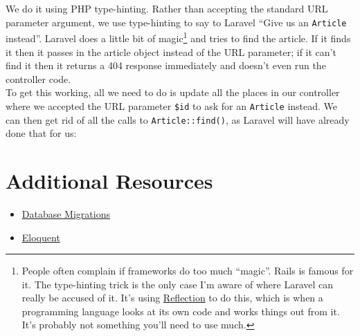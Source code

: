 We do it using PHP type-hinting. Rather than accepting the standard URL parameter argument, we use type-hinting to say to Laravel ``Give us an \texttt{Article} instead''. Laravel does a little bit of magic\footnote{People often complain if frameworks do too much ``magic''. Rails is famous for it. The type-hinting trick is the only case I'm aware of where Laravel can really be accused of it. It's using \href{https://www.culttt.com/2014/07/02/reflection-php}{Reflection} to do this, which is when a programming language looks at its own code and works things out from it. It's probably not something you'll need to use much.} and tries to find the article. If it finds it then it passes in the article object instead of the URL parameter; if it can't find it then it returns a 404 response immediately and doesn't even run the controller code.
\\

To get this working, all we need to do is update all the places in our controller where we accepted the URL parameter \texttt{\$id} to ask for an \texttt{Article} instead. We can then get rid of all the calls to \texttt{Article::find()}, as Laravel will have already done that for us:




\section{Additional Resources}

\begin{itemize}[leftmargin=*]
    \item \href{http://laravel.com/docs/master/migrations}{Database Migrations}
    \item \href{http://laravel.com/docs/master/eloquent}{Eloquent}
\end{itemize}
